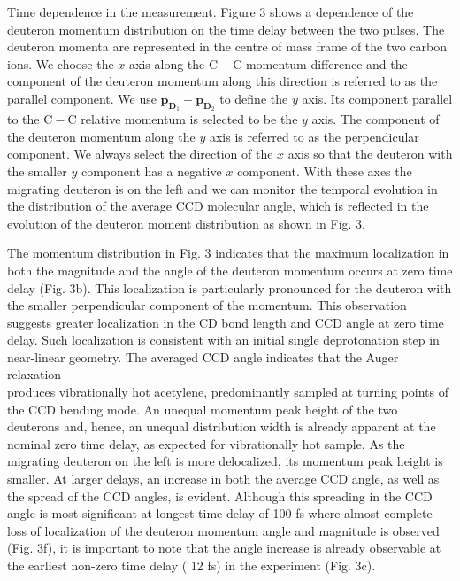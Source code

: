 \documentclass[10pt]{article}
\begin{document}
Time dependence in the measurement. Figure 3 shows a dependence of the deuteron momentum distribution on the time delay between the two pulses. The deuteron momenta are represented in the centre of mass frame of the two carbon ions. We choose the $x$ axis along the $\mathrm{C}-\mathrm{C}$ momentum difference and the component of the deuteron momentum along this direction is referred to as the parallel component. We use $\mathbf{p}_{\mathbf{D}_{1}}-\mathbf{p}_{\mathbf{D}_{2}}$ to define the $y$ axis. Its component parallel to the $\mathrm{C}-\mathrm{C}$ relative momentum is selected to be the $y$ axis. The component of the deuteron momentum along the $y$ axis is referred to as the perpendicular component. We always select the direction of the $x$ axis so that the deuteron with the smaller $y$ component has a negative $x$ component. With these axes the migrating deuteron is on the left and we can monitor the temporal evolution in the distribution of the average CCD molecular angle, which is reflected in the evolution of the deuteron moment distribution as shown in Fig. 3.

The momentum distribution in Fig. 3 indicates that the maximum localization in both the magnitude and the angle of the deuteron momentum occurs at zero time delay (Fig. 3b). This localization is particularly pronounced for the deuteron with the smaller perpendicular component of the momentum. This observation suggests greater localization in the CD bond length and CCD angle at zero time delay. Such localization is consistent with an initial single deprotonation step in near-linear geometry. The averaged CCD angle indicates that the Auger relaxation\\
produces vibrationally hot acetylene, predominantly sampled at turning points of the CCD bending mode. An unequal momentum peak height of the two deuterons and, hence, an unequal distribution width is already apparent at the nominal zero time delay, as expected for vibrationally hot sample. As the migrating deuteron on the left is more delocalized, its momentum peak height is smaller. At larger delays, an increase in both the average CCD angle, as well as the spread of the CCD angles, is evident. Although this spreading in the CCD angle is most significant at longest time delay of 100 fs where almost complete loss of localization of the deuteron momentum angle and magnitude is observed (Fig. 3f), it is important to note that the angle increase is already observable at the earliest non-zero time delay ( 12 fs) in the experiment (Fig. 3c).
\end{document}
